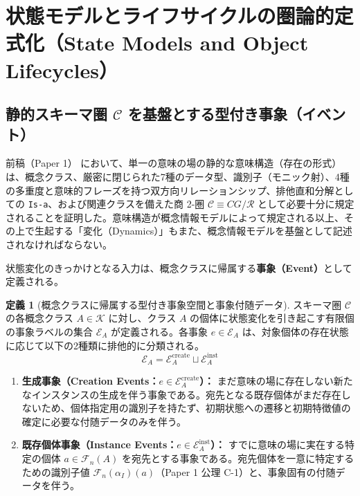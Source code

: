 \documentclass[11pt,a4paper]{ltjsarticle}
\theoremstyle{definition}
\newtheorem{definition}{定義}[section]
\theoremstyle{plain}
\theoremstyle{remark}
\begin{document}
\section{状態モデルとライフサイクルの圏論的定式化（State Models and Object Lifecycles）}

\subsection{静的スキーマ圏 $\mathcal{C}$ を基盤とする型付き事象（イベント）}
前稿（Paper 1）\cite{ota2026paper1} において、単一の意味の場の静的な意味構造（存在の形式）は、概念クラス、厳密に閉じられた7種のデータ型、識別子（モニック射）、4種の多重度と意味的フレーズを持つ双方向リレーションシップ、排他直和分解としての \texttt{Is-a}、および関連クラスを備えた商 2-圏 $\mathcal{C} \equiv CG/\mathcal{R}$ として必要十分に規定されることを証明した。意味構造が概念情報モデルによって規定される以上、その上で生起する「変化（Dynamics）」もまた、概念情報モデルを基盤として記述されなければならない。

状態変化のきっかけとなる入力は、概念クラスに帰属する\textbf{事象（Event）}として定義される。

\begin{definition}[概念クラスに帰属する型付き事象空間と事象付随データ]\label{def:events}
スキーマ圏 $\mathcal{C}$ の各概念クラス $A \in \mathcal{K}$ に対し、クラス $A$ の個体に状態変化を引き起こす有限個の事象ラベルの集合 $\mathcal{E}_A$ が定義される。各事象 $e \in \mathcal{E}_A$ は、対象個体の存在状態に応じて以下の2種類に排他的に分類される。
\begin{equation}
\mathcal{E}_A = \mathcal{E}_A^{\mathrm{create}} \sqcup \mathcal{E}_A^{\mathrm{inst}}
\end{equation}
\begin{enumerate}
    \item \textbf{生成事象（Creation Events：$e \in \mathcal{E}_A^{\mathrm{create}}$）：} まだ意味の場に存在しない新たなインスタンスの生成を伴う事象である。宛先となる既存個体がまだ存在しないため、個体指定用の識別子を持たず、初期状態への遷移と初期特徴値の確定に必要な付随データのみを伴う。
    \item \textbf{既存個体事象（Instance Events：$e \in \mathcal{E}_A^{\mathrm{inst}}$）：} すでに意味の場に実在する特定の個体 $a \in \mathcal{F}_n(A)$ を宛先とする事象である。宛先個体を一意に特定するための識別子値 $\mathcal{F}_n(\alpha_I)(a)$（Paper 1 公理 C-1）と、事象固有の付随データを伴う。
\end{enumerate}
\end{definition}
\end{document}
